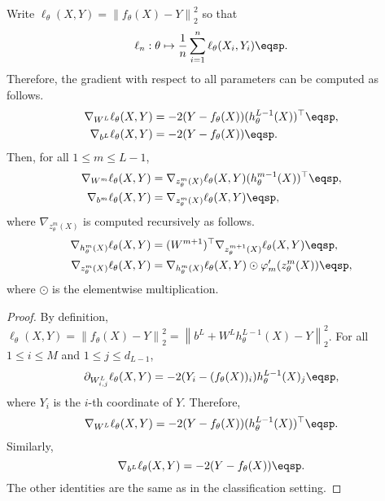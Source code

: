 \begin{shaded}
\begin{proposition}
\label{prop:backpropagation:classif}
Write $\ell_{\theta}(X,Y) =  \left\|f_{\theta}(X) - Y\right\|_2^2$ so that 
$$
\ell_n:\theta \mapsto \frac{1}{n} \sum_{i=1}^n \ell_{\theta}(X_i,Y_i)\eqsp. 
$$
Therefore, the gradient with respect to all parameters can be computed as follows.
\begin{align*}
\nabla_{W^L} \ell_{\theta}(X,Y) &= -2(Y - f_{\theta}(X))(h^{L-1}_{\theta}(X))^\top\eqsp,\\
\nabla_{b^L} \ell_{\theta}(X,Y) &=-2(Y - f_{\theta}(X))\eqsp.
\end{align*}
Then, for all $1\leqslant m\leqslant L-1$,
\begin{align*}
\nabla_{W^m} \ell_{\theta}(X,Y) &= \nabla_{z_{\theta}^m(X)}\ell_{\theta}(X,Y)(h_{\theta}^{m-1}(X))^\top\eqsp,\\
\nabla_{b^m} \ell_{\theta}(X,Y) &=  \nabla_{z_{\theta}^m(X)}\ell_{\theta}(X,Y)\eqsp,
\end{align*}
where $\nabla_{z_{\theta}^m(X)}$ is computed recursively as follows.
\begin{align*}
\nabla_{h_{\theta}^m(X)} \ell_{\theta}(X,Y) &= (W^{m+1})^\top\nabla_{z_{\theta}^{m+1}(X)} \ell_{\theta}(X,Y) \eqsp,\\
\nabla_{z_{\theta}^m(X)} \ell_{\theta}(X,Y) &= \nabla_{h_{\theta}^m(X)}\ell_{\theta}(X,Y) \odot \varphi_m'(z_{\theta}^{m}(X))\eqsp,
\end{align*}
where $\odot$ is the elementwise multiplication.
\end{proposition}
\end{shaded}
\begin{proof}
By definition, $\ell_{\theta}(X,Y) =  \left\|f_{\theta}(X) - Y\right\|_2^2 = \left\|b^L + W^Lh_{\theta}^{L-1}(X) - Y\right\|_2^2$.
For all $1\leqslant i\leqslant M$ and $1\leqslant j\leqslant d_{L-1}$,
$$
\partial_{W^L_{i,j}}\ell_{\theta}(X,Y) = -2(Y_i - (f_{\theta}(X))_i)h^{L-1}_{\theta}(X)_j\eqsp,
$$
where $Y_i$ is the $i$-th coordinate of $Y$. Therefore,
$$
\nabla_{W^L} \ell_{\theta}(X,Y) = -2(Y - f_{\theta}(X))(h^{L-1}_{\theta}(X))^\top\eqsp.
$$
Similarly, 
$$
\nabla_{b^L} \ell_{\theta}(X,Y) =-2(Y - f_{\theta}(X))\eqsp.
$$
The other identities are the same as in the classification setting.
\end{proof}


